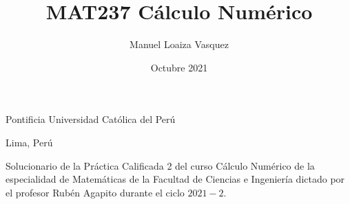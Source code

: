 \title{MAT237 C\'alculo Num\'erico}
\author{Manuel Loaiza Vasquez}
\date{Octubre 2021}



\maketitle

\vspace*{-0.25in}
\centerline{Pontificia Universidad Cat\'olica del Per\'u}
\centerline{Lima, Per\'u}
\centerline{}
\vspace*{0.15in}

\begin{framed}
    Solucionario de la Pr\'actica Calificada 2 del curso C\'alculo Num\'erico
    de la especialidad de Matem\'aticas de la Facultad de Ciencias e Ingenier\'ia
    dictado por el profesor Rub\'en Agapito durante el ciclo $2021-2$.
\end{framed}









